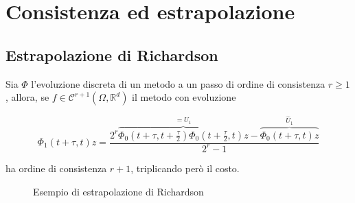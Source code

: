\documentclass[hidelinks, 10pt]{report}
\begin{document}
\section{Consistenza ed estrapolazione}
\subsection{Estrapolazione di Richardson}

Sia $ \Phi $ l'evoluzione discreta di un metodo a un passo di ordine di consistenza $ r \ge 1 $, allora, se $ f \in \mathcal{C}^{r + 1} (\Omega, \mathbb{R}^{d}) $ il metodo con evoluzione

\[ \Phi_{1}(t + \tau, t) z = \frac{2^{r} \overbrace{\Phi_{0} \left( t + \tau, t + \frac{\tau}{2} \right) \Phi_{0} \left( t + \frac{\tau}{2}, t \right) z}^{= U_{1}} - \overbrace{\Phi_{0}(t + \tau, t)z}^{\hat{U}_{1}} }{2^{r} - 1} \]

ha ordine di consistenza $ r + 1 $, triplicando per\`o il costo.

\begin{figure}[H]
\begin{center}

\caption{Esempio di estrapolazione di Richardson}
\end{center}
\end{figure}
\end{document}
